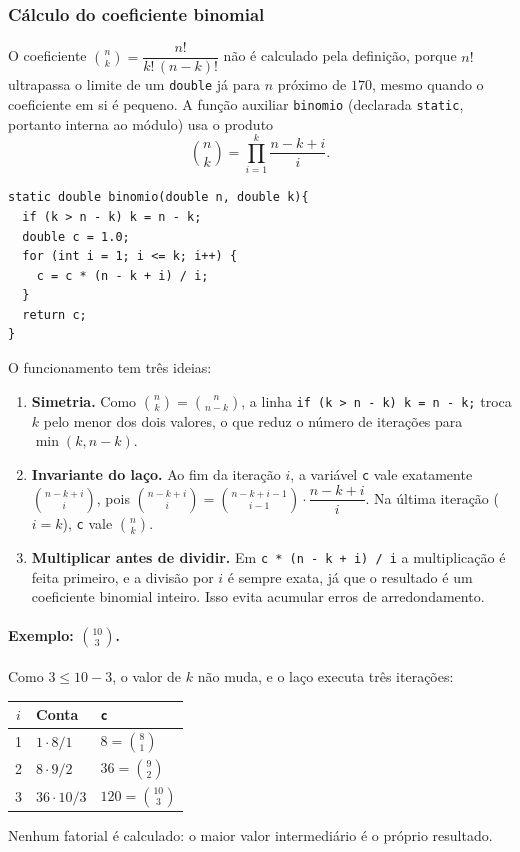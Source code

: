 \documentclass[12pt,a4paper]{article}
\newcommand{\cod}[1]{\texttt{#1}}
\begin{document}
\subsubsection{Cálculo do coeficiente binomial}
\label{sec:binomio}
O coeficiente $\binom{n}{k} = \dfrac{n!}{k!\,(n-k)!}$ não é calculado pela
definição, porque $n!$ ultrapassa o limite de um \cod{double} já para
$n$ próximo de $170$, mesmo quando o coeficiente em si é pequeno. A função
auxiliar \cod{binomio} (declarada \cod{static}, portanto interna ao módulo)
usa o produto
\[
  \binom{n}{k} = \prod_{i=1}^{k} \frac{n-k+i}{i}.
\]
 
\begin{lstlisting}
static double binomio(double n, double k){
  if (k > n - k) k = n - k;
  double c = 1.0;
  for (int i = 1; i <= k; i++) {
    c = c * (n - k + i) / i;
  }
  return c;
}
\end{lstlisting}
 
O funcionamento tem três ideias:
\begin{enumerate}
  \item \textbf{Simetria.} Como $\binom{n}{k} = \binom{n}{n-k}$, a linha
        \cod{if (k > n - k) k = n - k;} troca $k$ pelo menor dos dois valores,
        o que reduz o número de iterações para $\min(k, n-k)$.
  \item \textbf{Invariante do laço.} Ao fim da iteração $i$, a variável
        \cod{c} vale exatamente $\binom{n-k+i}{i}$, pois
        $\binom{n-k+i}{i} = \binom{n-k+i-1}{i-1} \cdot \dfrac{n-k+i}{i}$.
        Na última iteração ($i = k$), \cod{c} vale $\binom{n}{k}$.
  \item \textbf{Multiplicar antes de dividir.} Em \cod{c * (n - k + i) / i}
        a multiplicação é feita primeiro, e a divisão por $i$ é sempre exata,
        já que o resultado é um coeficiente binomial inteiro. Isso evita
        acumular erros de arredondamento.
\end{enumerate}
 
\paragraph{Exemplo: $\binom{10}{3}$.} Como $3 \le 10 - 3$, o valor de $k$ não
muda, e o laço executa três iterações:
\begin{center}
\begin{tabular}{@{}cll@{}}
\toprule
$i$ & Conta & \cod{c} \\
\midrule
1 & $1 \cdot 8 / 1$  & $8 = \binom{8}{1}$ \\
2 & $8 \cdot 9 / 2$  & $36 = \binom{9}{2}$ \\
3 & $36 \cdot 10 / 3$ & $120 = \binom{10}{3}$ \\
\bottomrule
\end{tabular}
\end{center}
Nenhum fatorial é calculado: o maior valor intermediário é o próprio resultado.
 
\end{document}
